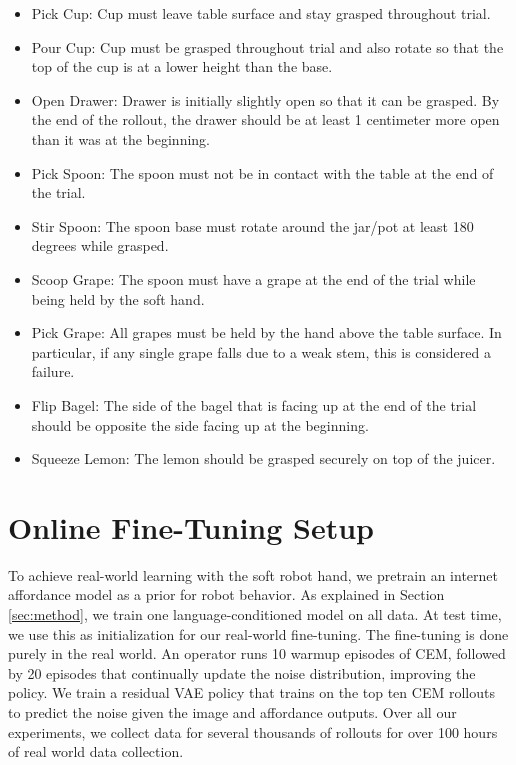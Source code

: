 \begin{itemize}
    \item Pick Cup: Cup must leave table surface and stay grasped throughout trial.
    \item Pour Cup: Cup must be grasped throughout trial and also rotate so that the top of the cup is at a lower height than the base.
    \item Open Drawer: Drawer is initially slightly open so that it can be grasped. By the end of the rollout, the drawer should be at least 1 centimeter more open than it was at the beginning.
    \item Pick Spoon: The spoon must not be in contact with the table at the end of the trial.
    \item Stir Spoon: The spoon base must rotate around the jar/pot at least 180 degrees while grasped.
    \item Scoop Grape: The spoon must have a grape at the end of the trial while being held by the soft hand.
    \item Pick Grape: All grapes must be held by the hand above the table surface. In particular, if any single grape falls due to a weak stem, this is considered a failure.
    \item Flip Bagel: The side of the bagel that is facing up at the end of the trial should be opposite the side facing up at the beginning.
    \item Squeeze Lemon: The lemon should be grasped securely on top of the juicer.
\end{itemize}

\section{Online Fine-Tuning Setup}

To achieve real-world learning with the soft robot hand, we pretrain an internet affordance model as a prior for robot behavior.  As explained in Section \ref{sec:method}, we train one language-conditioned model on all data.  At test time, we use this as initialization for our real-world fine-tuning. The fine-tuning is done purely in the real world.  An operator runs 10 warmup episodes of CEM, followed by 20 episodes that continually update the noise distribution, improving the policy. We train a residual VAE policy that trains on the top ten CEM rollouts to predict the noise given the image and affordance outputs. Over all our experiments, we collect data for several thousands of rollouts for over 100 hours of real world data collection.

